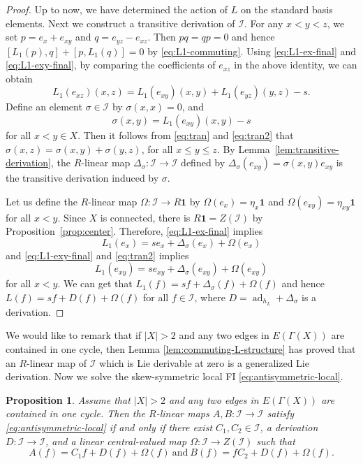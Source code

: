 \documentclass[reqno]{amsart}
\numberwithin{equation}{section}
\theoremstyle{plain}
\newtheorem{proposition}[theorem]{Proposition}
\theoremstyle{definition}
\newcommand{\I}{\mathcal I}
\newcommand{\one}{\mathbf 1}
\newcommand{\ad}{\operatorname{ad}}
\begin{document}
\begin{proof}
Up to now, we have determined the action of $L$ on the standard basis elements.
Next we construct a transitive derivation of $\I$. For any $x<y<z$, we set $p=e_x+e_{xy}$ and $q=e_{yz}-e_{xz}$.
Then $pq=qp=0$ and hence $[L_1(p),q]+[p,L_1(q)]=0$ by \eqref{eq:L1-commuting}.
Using \eqref{eq:L1-ex-final} and \eqref{eq:L1-exy-final}, by comparing the coefficients of
$e_{xz}$ in the above identity, we can obtain
\begin{equation}\label{eq:tran}
L_1(e_{xz})(x,z)=L_1(e_{xy})(x,y)+L_1(e_{yz})(y,z)-s.
\end{equation}
Define an element $\sigma\in \mathcal I$ by $\sigma(x,x)=0$, and
\begin{equation}\label{eq:tran2}
\sigma(x,y)=L_1(e_{xy})(x,y)-s
\end{equation}
for all $x<y\in X$. Then it follows from \eqref{eq:tran} and \eqref{eq:tran2} that
$\sigma(x,z)=\sigma(x,y)+\sigma(y,z)$, for all $x\leq y\leq z$.
By Lemma~\ref{lem:transitive-derivation}, the
$R$-linear map $\Delta_\sigma:\I\to\I$
defined by $\Delta_\sigma(e_{xy})=\sigma(x,y)e_{xy}$ is the transitive derivation induced by $\sigma$.

Let us define the $R$-linear map $\Omega:\I\to R\one$ by
$\Omega(e_x)=\eta_x\one$ and $\Omega(e_{xy})=\eta_{xy}\one$ for all $x<y$.
Since $X$ is connected, there is
$R\one=Z(\I)$ by Proposition~\ref{prop:center}. Therefore,
\eqref{eq:L1-ex-final} implies
\[
L_1(e_x)=se_x+\Delta_\sigma(e_x)+\Omega(e_x)
\]
and \eqref{eq:L1-exy-final} and \eqref{eq:tran2} implies
\[
L_1(e_{xy})=se_{xy}+\Delta_\sigma(e_{xy})+\Omega(e_{xy})
\]
for all $x<y$. We can get that
$L_1(f)=sf+\Delta_\sigma(f)+\Omega(f)$ and hence $L(f)=sf+D(f)+\Omega(f)$ for all $f\in \I$,
where $D=\ad_{h_L}+\Delta_\sigma$ is a derivation.
\end{proof}

We would like to remark that if $|X|>2$ and any two edges in $E(\Gamma(X))$ are contained in one cycle,
then Lemma \ref{lem:commuting-L-structure} has proved that an $R$-linear map of $\I$ which is Lie derivable at zero is a generalized Lie derivation.
Now we solve the skew-symmetric local FI \eqref{eq:antisymmetric-local}.

\begin{proposition}\label{thm:antisymmetric-standard-form}
Assume that $|X|>2$ and any two edges in $E(\Gamma(X))$ are contained in one cycle.
Then the $R$-linear maps $A,B:\I\to\I$ satisfy \eqref{eq:antisymmetric-local} if and only if there exist $C_1,C_2\in\I$, a derivation
$D:\I\to\I$, and a linear central-valued map
$\Omega:\I\to Z(\I)$ such that
\begin{equation}\label{eq:antisymmetric-standard-form}
A(f)=C_1f+D(f)+\Omega(f)~\text{and}~
B(f)=fC_2+D(f)+\Omega(f).
\end{equation}
\end{proposition}
\end{document}
